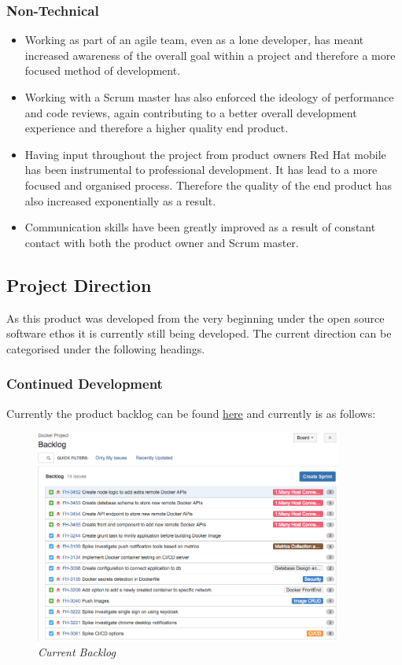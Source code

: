 \subsubsection{Non-Technical}
\begin{itemize}
	\item Working as part of an agile team, even as a lone developer, has meant increased awareness of the overall goal within a project and therefore a more focused method of development.
	\item Working with a \gls{Scrum} master has also enforced the ideology of performance and code reviews, again contributing to a better overall development experience and therefore a higher quality end product.
	\item Having input throughout the project from product owners Red Hat mobile has been instrumental to professional development. It has lead to a more focused and organised process. Therefore the quality of the end product has also increased exponentially as a result.
	\item Communication skills have been greatly improved as a result of constant contact with both the product owner and \gls{Scrum} master.
\end{itemize}

\newpage
\subsection{Project Direction}
As this product was developed from the very beginning under the open source software ethos it is currently still being developed. The current direction can be categorised under the following headings.

\subsubsection{Continued Development}
\label{subs:cont_dev}
Currently the product backlog can be found \href{https://issues.jboss.org/secure/RapidBoard.jspa?rapidView=3836&view=planning}{here} and currently is as follows:

\begin{figure}[!ht]
	\centering
	\includegraphics*[width=0.9\textwidth]{images/final_backlog}
	\caption{\em Current Backlog}
	\label{fig:final_backlog}
\end{figure}

